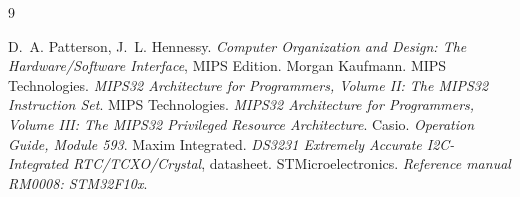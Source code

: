 \begin{thebibliography}{9}
 D.~A. Patterson, J.~L. Hennessy. \textit{Computer Organization and Design: The Hardware/Software Interface}, MIPS Edition. Morgan Kaufmann.
 MIPS Technologies. \textit{MIPS32 Architecture for Programmers, Volume II: The MIPS32 Instruction Set}.
 MIPS Technologies. \textit{MIPS32 Architecture for Programmers, Volume III: The MIPS32 Privileged Resource Architecture}.
 Casio. \textit{Operation Guide, Module 593}.
 Maxim Integrated. \textit{DS3231 Extremely Accurate I2C-Integrated RTC/TCXO/Crystal}, datasheet.
 STMicroelectronics. \textit{Reference manual RM0008: STM32F10x}.
\end{thebibliography}
